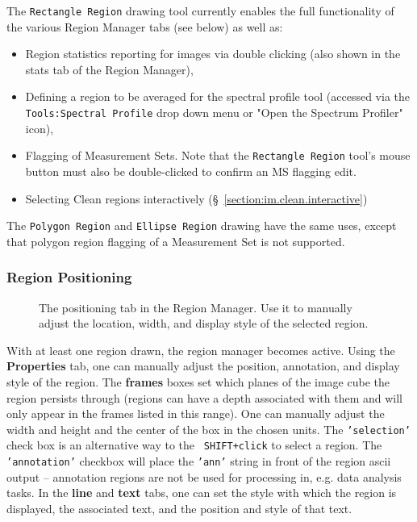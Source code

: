 The {\tt Rectangle Region} drawing tool currently enables the full functionality of the various
Region Manager tabs (see below) as well as: 
\begin{itemize}
  \item Region statistics reporting for images via double clicking (also shown in the stats tab of the Region Manager),
  \item Defining a region to be averaged for the spectral profile tool (accessed via the {\tt Tools:Spectral Profile} drop down menu or "Open the Spectrum Profiler" icon),
  \item Flagging of Measurement Sets. Note that the {\tt Rectangle Region} tool's mouse button must also be double-clicked to confirm an MS flagging edit.
  \item Selecting Clean regions interactively (\S~\ref{section:im.clean.interactive})
\end{itemize}

The {\tt Polygon Region} and {\tt Ellipse Region} drawing have the same uses, except that polygon region
flagging of a Measurement Set is not supported.

\subsubsection{Region Positioning}
\label{section:display.viewerGUI.displaypanel.region.pos}

\begin{figure}[h!]
\begin{center}
\caption{\label{fig:viewer_regionpos} The positioning tab in the Region Manager. Use it to
manually adjust the location, width, and display style of the selected region.}
\hrulefill
\end{center}
\end{figure}

With at least one region drawn, the region manager becomes active. Using the {\bf Properties}
tab, one can manually adjust the position, annotation, and display style of the region.
The {\bf frames} boxes set which planes of the image cube the region persists through (regions
can have a depth associated with them and will only appear in the frames listed in this range).
One can manually adjust the width and height and the center of the box in the chosen units.
The {\tt  'selection'} check box is an alternative way to the {\tt
  SHIFT+click} to select a region. The {\tt 'annotation'} checkbox
will place the {\tt 'ann'} string in front of the region ascii output
-- annotation regions are not be used for processing in, e.g. data
analysis tasks. In the {\bf line} and {\bf text} tabs, one can set the style with which the region is displayed,
the associated text, and the position and style of that text.

